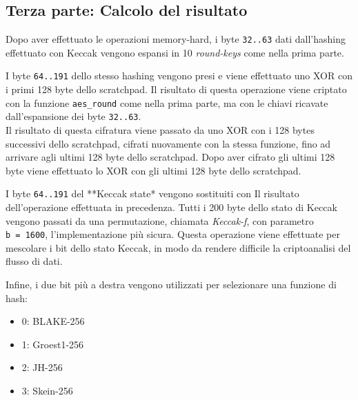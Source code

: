 \subsection{Terza parte: Calcolo del
risultato}\label{terza-parte-calcolo-del-risultato}

Dopo aver effettuato le operazioni memory-hard, i byte \texttt{32..63}
dati dall'hashing effettuato con Keccak vengono espansi in 10
\emph{round-keys} come nella prima parte.

I byte \texttt{64..191} dello stesso hashing vengono presi e viene
effettuato uno XOR con i primi 128 byte dello scratchpad. Il risultato
di questa operazione viene criptato con la funzione \texttt{aes\_round}
come nella prima parte, ma con le chiavi ricavate dall'espansione dei
byte \texttt{32..63}.\\
Il risultato di questa cifratura viene passato da uno XOR con i 128
bytes successivi dello scratchpad, cifrati nuovamente con la stessa
funzione, fino ad arrivare agli ultimi 128 byte dello scratchpad. Dopo
aver cifrato gli ultimi 128 byte viene effettuato lo XOR con gli ultimi
128 byte dello scratchpad.

I byte \texttt{64..191} del **Keccak state* vengono sostituiti con Il
risultato dell'operazione effettuata in precedenza. Tutti i 200 byte
dello stato di Keccak vengono passati da una permutazione, chiamata
\emph{Keccak-f}, con parametro \texttt{b\ =\ 1600}, l'implementazione
più sicura. Questa operazione viene effettuate per mescolare i bit dello
stato Keccak, in modo da rendere difficile la criptoanalisi del flusso
di dati.

Infine, i due bit più a destra vengono utilizzati per selezionare una
funzione di hash:

\begin{itemize}
  \item 
  0: BLAKE-256\cite{aumasson2008sha}
  \item
  1: Groest1-256\cite{groestl}
  \item 
  2: JH-256\cite{jh}
  \item 
  3: Skein-256\cite{skein}
\end{itemize}

